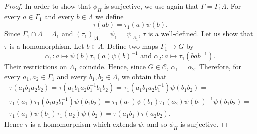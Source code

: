 \documentclass[10pt,a4paper]{amsart}
\begin{document}
\begin{proof}
In order to show that $\phi_H$ is surjective, we use again that $\Gamma=\Gamma_1\Lambda$. For every  $a\in \Gamma_1$ and  every $b\in \Lambda$ we define 
$$\tau(ab)=\tau_1(a)\psi(b).$$ Since $\Gamma_1\cap \Lambda=\Lambda_1$ and $(\tau_1)_{|\Lambda_1}=\psi_1= \psi_{|\Lambda_1}$, $\tau$ is a well-defined. 
Let us show that $\tau$ is a  homomorphism.  Let  $b\in \Lambda$. Define two maps $\Gamma_1\to G$ by 
$$\alpha_1: a\mapsto \psi(b)\tau_1(a) \psi(b)^{-1}\textrm{\ and \ } \alpha_2: a\mapsto  \tau_1(bab^{-1}). $$
Their restrictions on $\Lambda_1$ coincide. Hence, since $G\in \mathcal C$, $\alpha_1=\alpha_2$. Therefore, for every  $a_1,a_2\in \Gamma_1$ and  every $b_1,b_2\in \Lambda$, we obtain that
\begin{multline*}
\tau(a_1b_1a_2b_2)=\tau(a_1b_1a_2b_1^{-1}b_1b_2)=\tau_1(a_1b_1a_2b_1^{-1})\psi(b_1b_2)=\\
\tau_1(a_1)\tau_1(b_1a_2b_1^{-1})\psi(b_1b_2)=\tau_1(a_1)\psi(b_1)\tau_1(a_2)\psi(b_1)^{-1}\psi(b_1b_2)=\\ \tau_1(a_1)\psi(b_1)\tau_1(a_2)\psi(b_2)=\tau(a_1b_1)\tau(a_2b_2).
\end{multline*}
Hence $\tau$ is a homomorphism which extends $\psi$,  and so $\phi_H$ is surjective.
\end{proof}
\end{document}

